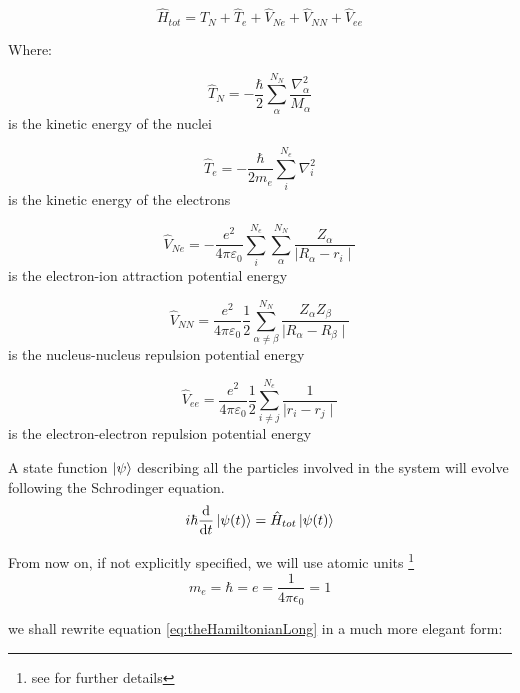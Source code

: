 \documentclass[a4paper,12pt]{article}
\begin{document}
\begin{equation}\label{eq:theHamiltonianLong}
\hat{H}_{tot} = \hat{T}_{N} + \hat{T}_{e} + \hat{V}_{Ne} + \hat{V}_{NN} + \hat{V}_{ee}
\end{equation}

Where:

\begin{equation}
\hat{T}_{N} = - \frac{\hbar}{2} \sum_{\alpha}^{N_N} \frac{\nabla_{\alpha}^2}{M_{\alpha}}
\end{equation}
is the kinetic energy of the nuclei

\begin{equation}
\hat{T}_{e} = - \frac{\hbar}{2m_{e}} \sum_{i}^{N_e} \nabla_{i}^2
\end{equation}
is the kinetic energy of the electrons

\begin{equation}
\hat{V}_{Ne} = -\frac{e^2}{4\pi\varepsilon_{0}} \sum_{i}^{N_e}\sum_{\alpha}^{N_N} \frac{Z_{\alpha}}{\mid R_{\alpha} - r_{i} \mid }
\end{equation}
is the electron-ion attraction potential energy

\begin{equation}
\hat{V}_{NN} = \frac{e^2}{4\pi\varepsilon_{0}} \frac{1}{2} \sum_{\alpha \neq \beta}^{N_N} \frac{Z_{\alpha} Z_{\beta}}{\mid R_{\alpha} - R_{\beta} \mid }
\end{equation}
is the nucleus-nucleus repulsion potential energy

\begin{equation}
\hat{V}_{ee} = \frac{e^2}{4\pi\varepsilon_{0}} \frac{1}{2} \sum_{i \neq j}^{N_e} \frac{1}{\mid r_{i} - r_{j} \mid }
\end{equation}
is the electron-electron repulsion potential energy

A state function $\ket{\psi}$ describing all the particles involved in the system will evolve following the Schrodinger equation.
\begin{equation}\label{eq:eq_sch}
	i\hbar\dv{t}\ket{\psi(t)} = \hat{H}_{tot}\ket{\psi(t)}
\end{equation}

From now on, if not explicitly specified, we will use atomic units \footnote{see \cite[p.42]{Attila} for further details}
\begin{equation}
	m_{e} = \hbar = e =\frac{1}{4 \pi \epsilon_{0}} = 1
\end{equation}

we shall rewrite equation \eqref{eq:theHamiltonianLong} in a much more elegant form:
\end{document}
